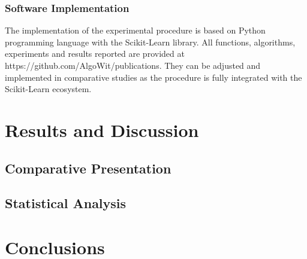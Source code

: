 \documentclass[parskip=full]{scrartcl}
\begin{document}
\subsubsection{Software Implementation}

The implementation of the experimental procedure is based on Python programming 
language with the Scikit-Learn 
\cite{PedregosaF.VaroquauxG.GramfortA.MichelV.ThirionB.GriselO.BlondelM.Prette.2011}
 library. All functions, algorithms, experiments and results reported are 
provided at https://github.com/AlgoWit/publications. They can be adjusted and 
implemented in comparative studies as the procedure is fully integrated with 
the Scikit-Learn ecosystem.    

\section{Results and Discussion}
\subsection{Comparative Presentation}
\subsection{Statistical Analysis}

\section{Conclusions}



\end{document}
